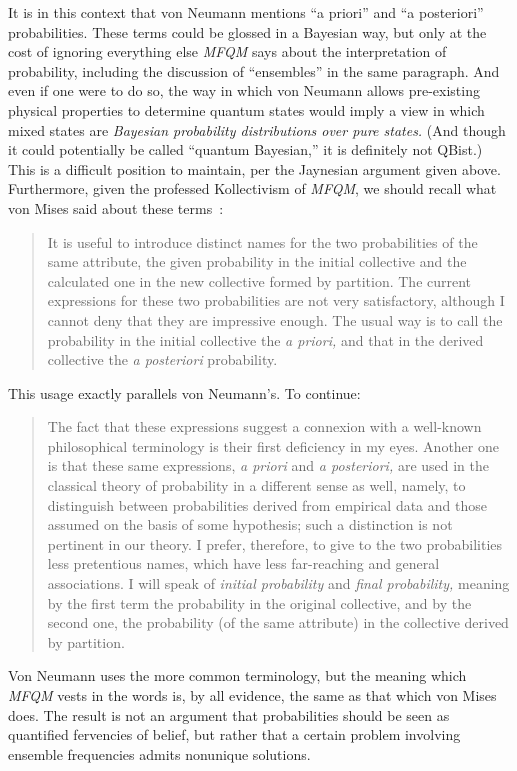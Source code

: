\documentclass[aps,pra,superscriptaddress,12pt,tightenlines,nofootinbib]{revtex4}
\newcommand{\MFQM}{\textsl{MFQM}}
\begin{document}
It is in this context that von Neumann mentions ``a priori'' and ``a
posteriori'' probabilities.  These terms could be glossed in a
Bayesian way, but only at the cost of ignoring everything else \MFQM{}
says about the interpretation of probability, including the discussion
of ``ensembles'' in the same paragraph.  And even if one were to do
so, the way in which von Neumann allows pre-existing physical
properties to determine quantum states would imply a view in which
mixed states are \emph{Bayesian probability distributions over pure
  states.}  (And though it could potentially be called ``quantum
Bayesian,'' it is definitely not QBist.)  This is a difficult position
to maintain, per the Jaynesian argument given above.  Furthermore,
given the professed Kollectivism of \MFQM, we should recall what von
Mises said about these terms~\cite[p.\ 46]{Mises1957}:
\begin{quotation}
It is useful to introduce distinct names for the two probabilities of
the same attribute, the given probability in the initial collective
and the calculated one in the new collective formed by partition.  The
current expressions for these two probabilities are not very
satisfactory, although I cannot deny that they are impressive enough.
The usual way is to call the probability in the initial collective the
\emph{a priori,} and that in the derived collective the \emph{a
  posteriori} probability.
\end{quotation}
This usage exactly parallels von Neumann's.  To continue:
\begin{quotation}
\noindent The fact that these expressions suggest a connexion with a
well-known philosophical terminology is their first deficiency in my
eyes.  Another one is that these same expressions, \emph{a priori} and
\emph{a posteriori,} are used in the classical theory of probability
in a different sense as well, namely, to distinguish between
probabilities derived from empirical data and those assumed on the
basis of some hypothesis; such a distinction is not pertinent in our
theory.  I prefer, therefore, to give to the two probabilities less
pretentious names, which have less far-reaching and general
associations.  I will speak of \emph{initial probability} and
\emph{final probability,} meaning by the first term the probability in
the original collective, and by the second one, the probability (of
the same attribute) in the collective derived by partition.
\end{quotation}
Von Neumann uses the more common terminology, but the meaning which
\MFQM{} vests in the words is, by all evidence, the same as that which
von Mises does.  The result is not an argument that probabilities
should be seen as quantified fervencies of belief, but rather that a
certain problem involving ensemble frequencies admits nonunique
solutions.
\end{document}
